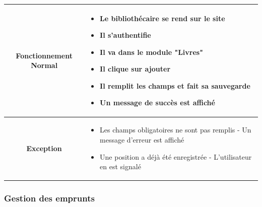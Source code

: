\par 
\begin{tabular}{|c|p{7cm}|}
        \hline
        \textbf{Fonctionnement Normal} & \begin{itemize}
                \item Le bibliothécaire se rend sur le site
                \item Il s'authentifie
                \item Il va dans le module "Livres"
                \item Il clique sur ajouter
                \item Il remplit les champs et fait sa sauvegarde
                \item Un message de succès est affiché
        \end{itemize} \\
        \hline
        \textbf{Exception} & \begin{itemize}
                \item Les champs obligatoires ne sont pas remplis - Un message 
                d'erreur est affiché
                \item Une position a déjà été enregistrée - L'utilisateur en est signalé
        \end{itemize} \\
        \hline
\end{tabular}

\subsubsection{Gestion des emprunts} 
